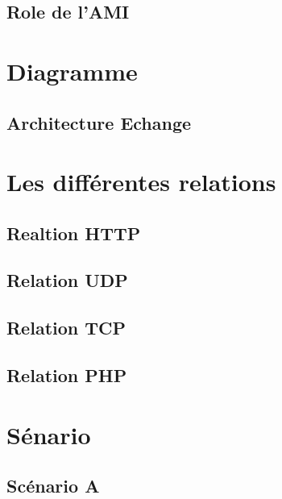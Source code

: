 \documentclass[a4paper, 11pt, french]{report}
\begin{document}
\subsection{Role de l'AMI}


\section{Diagramme}


\subsection{Architecture Echange}


\section{Les différentes relations}


\subsection{Realtion HTTP}


\subsection{Relation UDP}


\subsection{Relation TCP}


\subsection{Relation PHP}


\section{Sénario}


\subsection{Scénario A}

\end{document}

